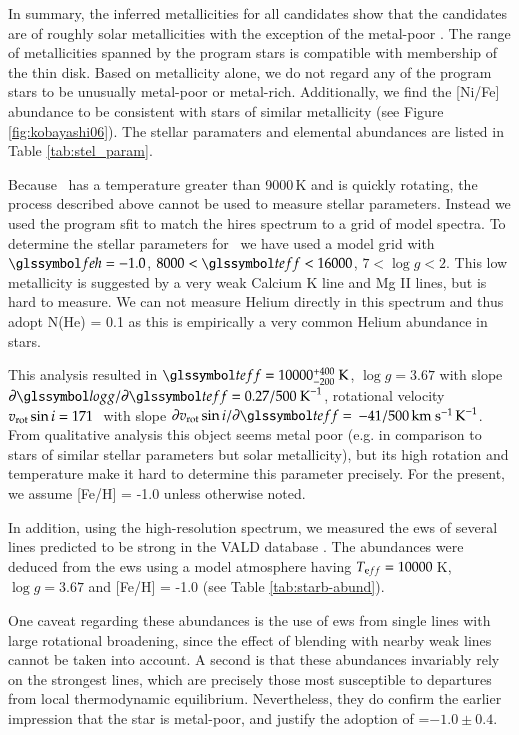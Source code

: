 In summary, the inferred metallicities for all candidates show that the candidates are of roughly solar metallicities with the exception of the metal-poor \starc. The range of metallicities spanned by the program stars is compatible with membership of the thin disk. Based on metallicity alone, we do not regard any of the program stars to be unusually metal-poor or metal-rich.  Additionally, we find the [Ni/Fe] abundance to be consistent with stars of similar metallicity (see Figure \ref{fig:kobayashi06}). The stellar paramaters and elemental abundances are listed in Table \ref{tab:stel_param}.

Because \starb\ has a temperature  greater than 9000\,K and is quickly rotating, the process described above cannot be used to measure stellar parameters. Instead we used the program \gls{sfit} to match the \gls{hires} spectrum to a grid of model spectra. To determine the stellar parameters for \starb\ we have used a model grid with $\feh= -1.0$, $8000 < \teff < 16000$, $7 < \log{g} < 2$. This low metallicity is suggested by a very weak Calcium K line and Mg II lines, but is hard to measure. We can not measure Helium directly in this spectrum and thus adopt N(He) = 0.1 as this is empirically a very common Helium abundance in stars.

This analysis resulted in $\teff = 10000^{+ 400}_{-200}~\textrm{K}$, $\log{g} = 3.67$ with slope  $\partial \logg/\partial \teff = 0.27/500~\textrm{K}^{-1}$, rotational velocity $v_{\textrm{rot}} \sin{i} = 171$\,\kms\ with slope $\partial \vrot \sin{i} / \partial \teff =$ $ -41/500\,\textrm{km}~\textrm{s}^{-1}\,\textrm{K}^{-1}$. From qualitative analysis this object seems metal poor (e.g. in comparison to stars of similar stellar parameters but solar metallicity), but its high rotation and temperature make it hard to determine this parameter precisely. For the present, we assume [Fe/H] = -1.0 unless otherwise noted.

In addition, using the high-resolution spectrum, we measured the \glspl{ew} of several lines predicted to be strong in the VALD database \citep{2000BaltA...9..590K}. The abundances were deduced from the \glspl{ew} using a model atmosphere having $T_{\textrm eff} = 10000$\,K, $\log{g}=3.67$ and [Fe/H] = -1.0 (see Table \ref{tab:starb-abund}).

One caveat regarding these abundances is the use of \glspl{ew} from 
single lines with large rotational broadening, since the effect of blending 
with nearby weak lines cannot be taken into account. A second is that these 
abundances invariably rely on the strongest lines, which are precisely those 
most susceptible to departures from local thermodynamic equilibrium. 
Nevertheless, they do confirm the earlier impression that the star is 
metal-poor, and justify the adoption of \feh=$-1.0 \pm 0.4$.


